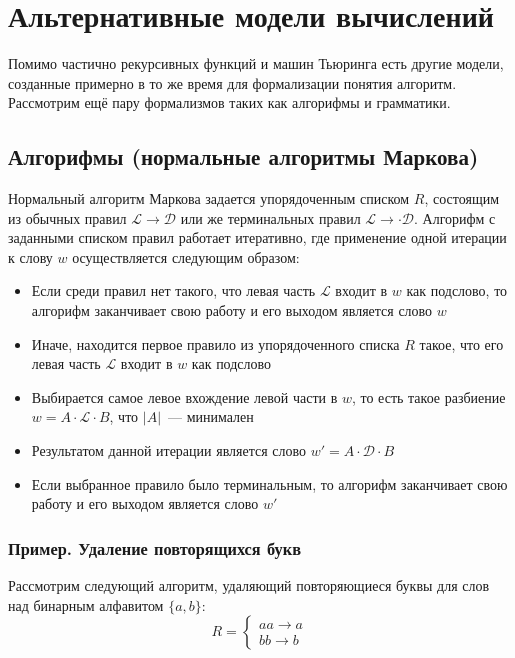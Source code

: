 \documentclass[
    11pt,
    a4paper
]{article}
\theoremstyle{definition}
\begin{document}
\section{Альтернативные модели вычислений}

Помимо частично рекурсивных функций и машин Тьюринга есть другие модели, созданные примерно в то же время для формализации понятия алгоритм. Рассмотрим ещё пару формализмов таких как алгорифмы и грамматики.

\subsection{Алгорифмы (нормальные алгоритмы Маркова)}

Нормальный алгоритм Маркова задается упорядоченным списком $R$, состоящим из обычных правил $\mathcal{L} \rightarrow \mathcal{D}$ или же терминальных правил $\mathcal{L} \rightarrow \cdot \mathcal{D}$. Алгорифм с заданными списком правил работает итеративно, где применение одной итерации к слову $w$ осуществляется следующим образом:
\begin{itemize}
\item Если среди правил нет такого, что левая часть $\mathcal{L}$ входит в $w$ как подслово, то алгорифм заканчивает свою работу и его выходом является слово $w$
\item Иначе, находится первое правило из упорядоченного списка $R$ такое, что его левая часть $\mathcal{L}$ входит в $w$ как подслово
\item Выбирается самое левое вхождение левой части в $w$, то есть такое разбиение $w = A \cdot \mathcal{L} \cdot B$, что $|A|$~--- минимален
\item Результатом данной итерации является слово $w' = A \cdot \mathcal{D} \cdot B$
\item Если выбранное правило было терминальным, то алгорифм заканчивает свою работу и его выходом является слово $w'$
\end{itemize}

\subsubsection{Пример. Удаление повторящихся букв}

Рассмотрим следующий алгоритм, удаляющий повторяющиеся буквы для слов над бинарным алфавитом $\{a, b\}$:
$$R = \begin{cases}aa \rightarrow a\\bb \rightarrow b\end{cases}$$
\end{document}
